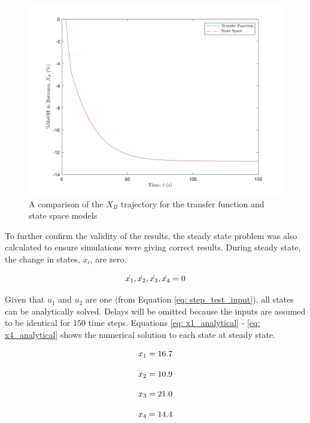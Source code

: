 \begin{figure}[h]
    \centering
    \includegraphics[scale=0.35]{images/X_B_Benchmark.png}
    \caption{A comparison of the $X_B$ trajectory for the transfer function and state space models}
    \label{fig: X_B_Benchmark}
\end{figure}

To further confirm the validity of the results, the steady state problem was also calculated to ensure simulations were giving correct results. During steady state, the change in states, $\dot{x_i}$, are zero.

\begin{equation}
    \centering
    \dot{x_1}, \dot{x_2}, \dot{x_3}, \dot{x_4} = 0
\end{equation}

Given that $u_1$ and $u_2$ are one (from Equation \ref{eq: step_test_input}), all states can be analytically solved.  Delays will be omitted because the inputs are assumed to be identical for 150 time steps. Equations \ref{eq: x1_analytical} - \ref{eq: x4_analytical} shows the numerical solution to each state at steady state.

{
\begin{equation}
    \centering
    x_1 = 16.7
    \label{eq: x1_analytical}
\end{equation}

\begin{equation}
    \centering
    x_2 = 10.9
    \label{eq: x2_analytical}
\end{equation}

\begin{equation}
    \centering
    x_3 = 21.0
    \label{eq: x3_analytical}
\end{equation}

\begin{equation}
    \centering
    x_4 = 14.4
    \label{eq: x4_analytical}
\end{equation}
}

